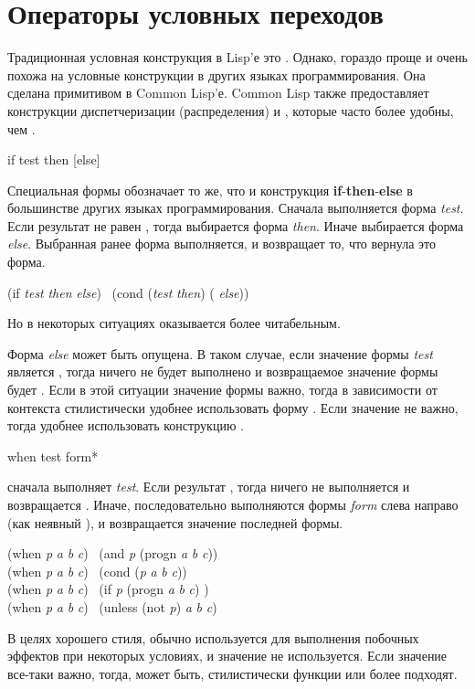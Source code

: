 \section{Операторы условных переходов}

Традиционная условная конструкция в Lisp'е это .
Однако,  гораздо проще и очень похожа на условные конструкции в других
языках программирования. Она сделана примитивом в Common Lisp'е.
Common Lisp также предоставляет конструкции диспетчеризации (распределения)
 и , которые часто более удобны, чем .

\begin{defspec}
if test then [else]

Специальная формы  обозначает то же, что и конструкция
\textbf{if}-\textbf{then}-\textbf{else} в большинстве других языках
программирования.
Сначала выполняется форма \emph{test}. Если результат не равен {\false}, тогда
выбирается форма \emph{then}. Иначе выбирается форма \emph{else}.
Выбранная ранее форма выполняется, и  возвращает то, что вернула это
форма.
\begin{lisp}
(if \emph{test} \emph{then} \emph{else}) \EQ\ (cond (\emph{test} \emph{then}) ({\true} \emph{else}))
\end{lisp}
Но в некоторых ситуациях  оказывается более читабельным.

Форма \emph{else} может быть опущена. В таком случае, если значение формы
\emph{test} является {\false}, тогда ничего не будет выполнено и возвращаемое
значение формы  будет {\false}.
Если в этой ситуации значение формы  важно, тогда в зависимости от
контекста стилистически удобнее использовать форму .
Если значение не важно, тогда удобнее использовать конструкцию .
\end{defspec}

\begin{defmac}
when test {form}*

сначала выполняет \emph{test}. Если результат {\false}, тогда ничего не
выполняется и возвращается {\false}.
Иначе, последовательно выполняются формы \emph{form}
слева направо (как неявный ), и возвращается значение последней
формы.
\begin{lisp}
(when \emph{p} \emph{a} \emph{b} \emph{c}) \EQ\ (and \emph{p} (progn \emph{a} \emph{b} \emph{c})) \\
(when \emph{p} \emph{a} \emph{b} \emph{c}) \EQ\ (cond (\emph{p} \emph{a} \emph{b} \emph{c})) \\
(when \emph{p} \emph{a} \emph{b} \emph{c}) \EQ\ (if \emph{p} (progn \emph{a} \emph{b} \emph{c}) {\false}) \\
(when \emph{p} \emph{a} \emph{b} \emph{c}) \EQ\ (unless (not \emph{p}) \emph{a} \emph{b} \emph{c})
\end{lisp}
В целях хорошего стиля,  обычно используется для выполнения побочных
эффектов при некоторых условиях, и значение  не используется.
Если значение все-таки важно, тогда, может быть, стилистически функции
 или  более подходят.
\end{defmac}

